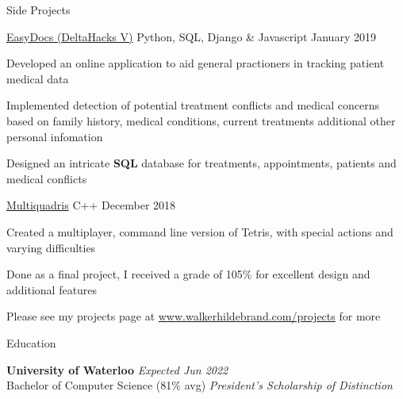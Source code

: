 \documentclass{resume} %
\begin{document}

\begin{rSection}{Side Projects}
    
    \begin{sideproject}
        {\href{https://github.com/wbhildeb/EasyDocs}{\faGithub{} EasyDocs (DeltaHacks V)}}
        {Python, SQL, Django \& Javascript}
        {January 2019}
        {
            \item Developed an online application to aid general practioners in tracking patient medical data
            \item Implemented detection of potential treatment conflicts and medical concerns based on family history, medical conditions, current treatments additional other personal infomation
            \item Designed an intricate \textbf{SQL} database for treatments, appointments, patients and medical conflicts
        }
    \end{sideproject}

    \begin{sideproject}
        {\href{https://github.com/wbhildeb/Multiquadris}{\faGithub{} Multiquadris}}
        {C++}
        {December 2018}
        {
            \item Created a multiplayer, command line version of Tetris, with special actions and varying difficulties
            \item Done as a final project, I received a grade of 105\% for excellent design and additional features
        }
    \end{sideproject}

    Please see my projects page at \href{http://www.walkerhildebrand.com/projects}{www.walkerhildebrand.com/projects} for more

\end{rSection}


\begin{rSection}{Education}

    {\bf University of Waterloo} \hfill {\em Expected Jun 2022} \\
    Bachelor of Computer Science (81\% avg) \hfill {\em President's Scholarship of Distinction}
    
\end{rSection}
\end{document}
